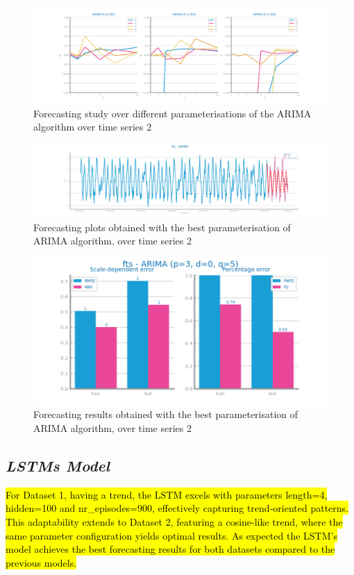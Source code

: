 \documentclass[10pt]{extarticle}
\newcommand{\ctext}[3][RGB]{%
  \begingroup
  \definecolor{hlcolor}{#1}{#2}\sethlcolor{hlcolor}%
  \hl{#3}%
  \endgroup
}
\begin{document}
\begin{figure}[H]
\centering\includegraphics[scale=0.4]{images/dataset2/time_series/fts_arima_R2_study.png}
\caption{Forecasting study over different parameterisations of the ARIMA algorithm over time series 2}
\end{figure}

\begin{figure}[H]
\centering\includegraphics[scale=0.4]{images/dataset2/time_series/fts_arima_R2_forecast.png}
\caption{Forecasting plots obtained with the best parameterisation of ARIMA algorithm, over time series 2}
\end{figure}

\begin{figure}[H]
\centering\includegraphics[scale=0.5]{images/dataset2/time_series/fts_arima_R2_eval.png}
\caption{Forecasting results obtained with the best parameterisation of ARIMA algorithm, over time series 2}
\end{figure}

\subsection*{\textit{LSTMs Model}}
\ctext[RGB]{190,190,190}{For Dataset 1, having a trend, the LSTM excels with parameters length=4, hidden=100 and nr\_episodes=900, effectively capturing trend-oriented patterns. This adaptability extends to Dataset 2, featuring a cosine-like trend, where the same parameter configuration yields optimal results. As expected the LSTM's model achieves the best forecasting results for both datasets compared to the previous models.}
\end{document}

